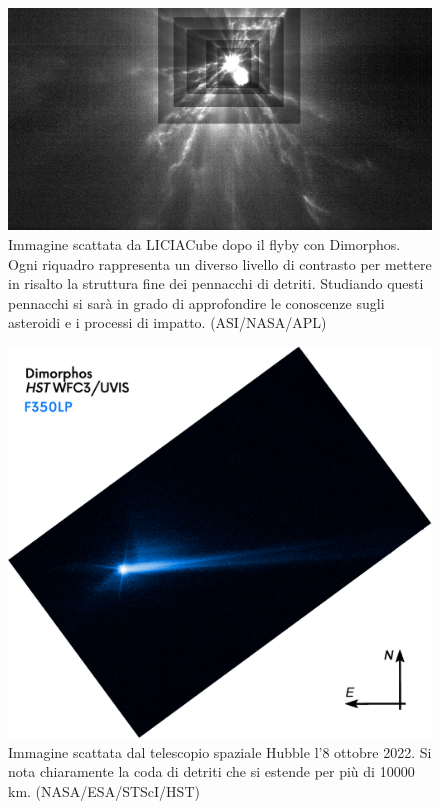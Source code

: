 \documentclass[a4paper,11pt,openright]{book}
\begin{document}
\begin{figure}
    \centering
    \includegraphics[width=\textwidth]{figure/liciacube_impact_tot.jpg}
    \caption[Immagine scattata da LICIACube dopo il flyby con Dimorphos.]{Immagine scattata da LICIACube dopo il flyby con Dimorphos. Ogni riquadro rappresenta un diverso livello di contrasto per mettere in risalto la struttura fine dei pennacchi di detriti. Studiando questi pennacchi si sarà in grado di approfondire le conoscenze sugli asteroidi e i processi di impatto. (ASI/NASA/APL)}
    \label{fig:liciacube_impact_tot}
\end{figure}

\begin{figure}
    \centering
    \includegraphics[scale=0.25]{figure/hst_plume.png}
    \caption[Immagine della coda di detriti scattata da HST.]{Immagine scattata dal telescopio spaziale Hubble l'8 ottobre 2022. Si nota chiaramente la coda di detriti che si estende per più di 10000 km. (NASA/ESA/STScI/HST)}
    \label{fig:hst_plume}
\end{figure}


\cleardoublepage
\printbibliography
\end{document}
